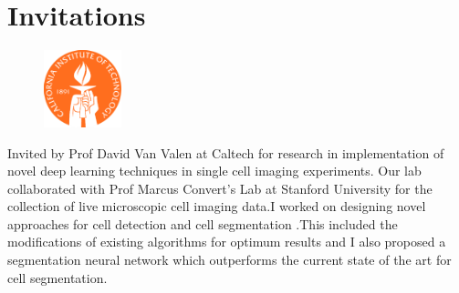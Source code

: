 \documentclass[]{deedy-resume-openfont}
\begin{document}
\begin{minipage}[t]{0.66\textwidth}

\section{Invitations}
\begin{figure}
  \begin{center}
    \includegraphics[width=0.20\textwidth]{caltechlogo.png}
  \end{center}
\end{figure}
Invited by Prof David Van Valen at Caltech for research in implementation of novel deep learning techniques in single cell imaging experiments. Our lab collaborated with Prof Marcus Convert's Lab at Stanford University for the collection of live microscopic cell imaging data.I worked on designing novel approaches for cell detection and cell segmentation .This included the modifications of existing algorithms for optimum results and I also proposed a segmentation neural network which outperforms the current state of the art for cell segmentation. \newline
\sectionsep



\end{minipage}
\end{document}
